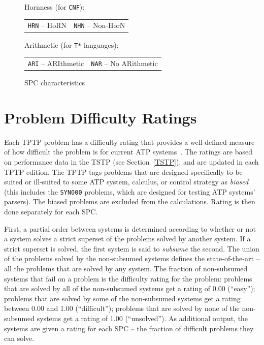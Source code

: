 \documentclass{easychair}
\newenvironment{packed_itemize}{
\vspace*{-0.2em}
\begin{itemize}
\setlength{\partopsep}{0pt}
\setlength{\itemsep}{1pt}
\setlength{\parskip}{0pt}
\setlength{\parsep}{0pt}
}{\end{itemize}}
\begin{document}
\begin{figure}[bht]
\begin{packed_itemize}
\item Hornness (for {\tt CNF}): \\
      \begin{tabular}{@{}p{5cm}l}
      {\tt HRN} -- HoRN &
      {\tt NHN} -- Non-HorN
      \end{tabular}
\item Arithmetic (for {\tt T*} languages): \\
      \begin{tabular}{@{}p{5cm}l}
      {\tt ARI} -- ARIthmetic &
      {\tt NAR} -- No ARithmetic
      \end{tabular}
\end{packed_itemize}
\caption{SPC characteristics}
\label{SPCCharacteristics}
\end{figure} 

\section{Problem Difficulty Ratings}
\label{Ratings}

Each TPTP problem has a difficulty rating that provides a well-defined measure of how difficult 
the problem is for current ATP systems~\cite{SS01}.
The ratings are based on performance data in the TSTP (see Section~\ref{TSTP}), and are updated
in each TPTP edition.
The TPTP tags problems that are designed specifically to be suited or ill-suited to some ATP
system, calculus, or control strategy as {\em biased}
(this includes the {\tt SYN000} problems, which are designed for testing ATP systems' parsers).
The biased problems are excluded from the calculations.
Rating is then done separately for each SPC.

First, a partial order between systems is determined according to whether or not a system 
solves a strict superset of the problems solved by another system. 
If a strict superset is solved, the first system is said to {\em subsume} the second. 
The union of the problems solved by the non-subsumed systems defines the state-of-the-art -- all 
the problems that are solved by any system. 
The fraction of non-subsumed systems that fail on a problem is the difficulty rating 
for the problem:
problems that are solved by all of the non-subsumed systems get a rating of 0.00 (``easy'');
problems that are solved by some of the non-subsumed systems get a rating between 
0.00 and 1.00 (``difficult''); 
problems that are solved by none of the non-subsumed systems get a rating of 1.00 (``unsolved'').
As additional output, the systems are given a rating for each SPC -- the fraction of difficult 
problems they can solve.
\end{document}

